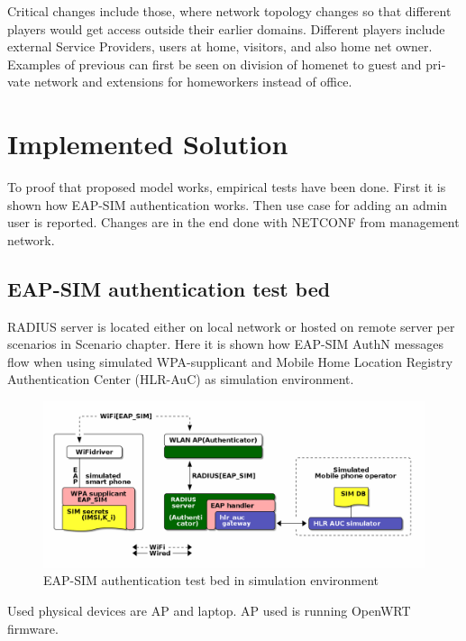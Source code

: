 \documentclass[12pt,a4paper,english]{tutthesis}
\begin{document}
\begin{otherlanguage}{english}
Critical changes include those, where network topology changes so
that different players would get access outside their earlier domains.
Different players include external Service Providers, users at home,
visitors, and also home net owner. Examples of previous can first be
seen on division of homenet to guest and private network and
extensions for homeworkers instead of office.







\chapter{Implemented Solution}
\label{sec-5}


To proof that proposed model works, empirical tests have been done.
First it is shown how EAP-SIM authentication works. Then use case for
adding an admin user is reported. Changes are in the end done with
NETCONF from management network.

\section{EAP-SIM authentication test bed}
\label{sec-5-1}
RADIUS server is located either on local network or hosted on remote
server per scenarios in Scenario chapter. 
Here it is shown  how EAP-SIM AuthN messages flow when using 
simulated WPA-supplicant and Mobile Home Location Registry Authentication Center (HLR-AuC) as simulation environment.

\begin{figure}[htb]
\centering
\includegraphics[width=.9\linewidth]{demoinfra.png}
\caption{\label{eap-sim-testbed}EAP-SIM authentication test bed in simulation environment}
\end{figure}





Used physical devices are AP and laptop.
AP used is running OpenWRT firmware.


\end{otherlanguage}
\end{document}
